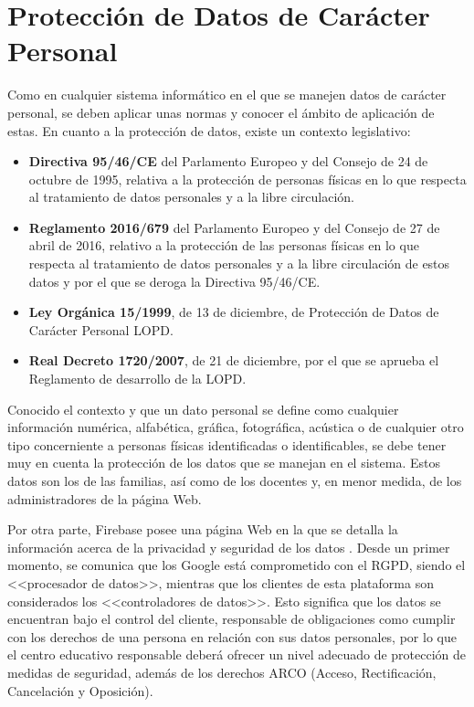 \chapter{Protección de Datos de Carácter Personal}
\label{chap:lopd}
Como en cualquier sistema informático en el que se manejen datos de carácter personal, se deben aplicar unas normas y conocer el ámbito de aplicación de estas.  En cuanto a la protección de datos, existe un contexto legislativo:

\begin{itemize}
	\item \textbf{Directiva 95/46/CE} del Parlamento Europeo y del Consejo de 24 de octubre de 1995, relativa a la protección de personas físicas en lo que respecta al tratamiento de datos personales y a la libre circulación.
	\item \textbf{Reglamento 2016/679} del Parlamento Europeo y del Consejo de 27 de abril de 2016, relativo a la protección de las personas físicas en lo que respecta al tratamiento de datos personales y a la libre circulación de estos datos y por el que se deroga la Directiva 95/46/CE.
	\item \textbf{Ley Orgánica 15/1999}, de 13 de diciembre, de Protección de Datos de Carácter Personal \acf{LOPD}.
	\item \textbf{Real Decreto 1720/2007}, de 21 de diciembre, por el que se aprueba el Reglamento de desarrollo de la \acs{LOPD}.
\end{itemize}

Conocido el contexto y que un dato personal se define como cualquier información numérica, alfabética, gráfica, fotográfica, acústica o de cualquier otro tipo concerniente a personas físicas identificadas o identificables, se debe tener muy en cuenta la protección de los datos que se manejan en el sistema. Estos datos son los de las familias, así como de los docentes y, en menor medida, de los administradores de la página Web.

Por otra parte, Firebase posee una página Web en la que se detalla la información acerca de la privacidad y seguridad de los datos \cite{Firebase2018}. Desde un primer momento, se comunica que los Google está comprometido con el \acs{RGPD}, siendo el <<procesador de datos>>, mientras que los clientes de esta plataforma son considerados los <<controladores de datos>>. Esto significa que los datos se encuentran bajo el control del cliente, responsable de obligaciones como cumplir con los derechos de una persona en relación con sus datos personales, por lo que el centro educativo responsable deberá ofrecer un nivel adecuado de protección de medidas de seguridad, además de los derechos ARCO (Acceso, Rectificación, Cancelación y Oposición).